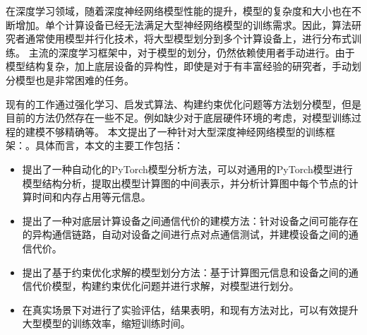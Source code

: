 在深度学习领域，随着深度神经网络模型性能的提升，模型的复杂度和大小也在不断增加。单个计算设备已经无法满足大型神经网络模型的训练需求。因此，算法研究者通常使用模型并行化技术，将大型模型划分到多个计算设备上，进行分布式训练。
主流的深度学习框架中，对于模型的划分，仍然依赖使用者手动进行。由于模型结构复杂，加上底层设备的异构性，即使是对于有丰富经验的研究者，手动划分模型也是非常困难的任务。

现有的工作通过强化学习、启发式算法、构建约束优化问题等方法划分模型，但是目前的方法仍然存在一些不足。例如缺少对于底层硬件环境的考虑，对模型训练过程的建模不够精确等。
本文提出了一种针对大型深度神经网络模型的训练框架：\sys{}。具体而言，本文的主要工作包括：
\begin{itemize}
	\item 提出了一种自动化的PyTorch模型分析方法，可以对通用的PyTorch模型进行模型结构分析，提取出模型计算图的中间表示，并分析计算图中每个节点的计算时间和内存占用等元信息。
	\item 提出了一种对底层计算设备之间通信代价的建模方法：针对设备之间可能存在的异构通信链路，自动对设备之间进行点对点通信测试，并建模设备之间的通信代价。
	\item 提出了基于约束优化求解的模型划分方法：基于计算图元信息和设备之间的通信代价模型，构建约束优化问题并进行求解，对模型进行划分。
	\item 在真实场景下对\sys{}进行了实验评估，结果表明，和现有方法对比，\sys{}可以有效提升大型模型的训练效率，缩短训练时间。
\end{itemize}
